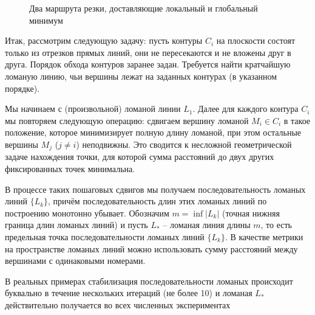 \documentclass[10pt]{SPIIRAS_Proceedings}
\begin{document}
\begin{figure}
  \begin{center}
  \end{center}
  \caption{Два маршрута резки, доставляющие локальный и глобальный минимум}
  \label{counter-example}
\end{figure}

Итак,
рассмотрим следующую задачу:
пусть контуры
$C_i$
на плоскости состоят
только из отрезков прямых линий,
они не пересекаются и не вложены друг в друга.
Порядок обхода контуров
заранее задан.
Требуется найти кратчайшую ломаную линию,
чьи вершины лежат на заданных контурах
(в указанном порядке).

Мы начинаем с
(произвольной)
ломаной линии
$L_1$.
Далее для каждого контура
$C_i$
мы повторяем следующую операцию:
сдвигаем вершину ломаной
$M_i \in C_i$
в такое положение,
которое минимизирует полную
длину ломаной,
при этом остальные вершины
$M_j$
($j \ne i$)
неподвижны.
Это сводится к несложной геометрической
задаче нахождения точки,
для которой сумма расстояний
до двух других фиксированных точек
минимальна.

В процессе таких пошаговых сдвигов
мы получаем последовательность
ломаных линий
$\{L_k\}$,
причём последовательность
длин этих ломаных линий
по построению монотонно убывает.
Обозначим
$m = \inf |L_k|$
(точная нижняя граница длин ломаных линий)
и пусть
$L_*$  --
ломаная линия длины
$m$,
то есть предельная точка
последовательности ломаных линий
$\{L_k\}$.
В качестве метрики на пространстве ломаных линий
можно использовать сумму расстояний между
вершинами с одинаковыми номерами.

  В реальных примерах
  стабилизация последовательности ломаных
  происходит буквально в течение
  нескольких итераций
  (не более 10)
  и ломаная
  $L_*$
  действительно получается
  во всех численных экспериментах
\end{document}
